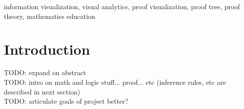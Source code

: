 \documentclass[conference]{IEEEtran}
\begin{document}
\newcommand{\sentencefive}{The proof visualization tool allows either open exploration of a proof or a directed walk-through, revealing supplementary information to serve as a form of discourse as the nodes are visited.}


\newcommand{\sentencesix}{This work provides a tool for gaining understanding of the structure of proofs, insight into the processes used in constructing such proofs, and also serves as a starting point for visualizations of proof trees in more complicated logics.}




\begin{abstract}
    \sentenceone{} \sentencetwo{} \sentencethree{} \sentencefour{} \sentencefive{} \sentencesix{}
\end{abstract}


\begin{IEEEkeywords}
    information visualization, visual analytics, proof visualization, proof tree, proof theory, mathematics education
\end{IEEEkeywords}


\section{Introduction}
\label{sec:intro}



TODO: expand on abstract \\

TODO: intro on math and logic stuff... proof... etc (inference rules, etc are described in next section) \\

TODO: articulate goals of project better? \\
\end{document}
